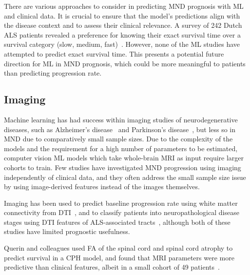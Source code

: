 There are various approaches to consider in predicting MND prognosis with ML and clinical data.
It is crucial to ensure that the model's predictions align with the disease context and to assess their clinical relevance.
A survey of 242 Dutch ALS patients revealed a preference for knowing their exact survival time over a survival category (slow, medium, fast)~\cite{westenengPrognosisPatientsAmyotrophic2018}.
However, none of the ML studies have attempted to predict exact survival time.
This presents a potential future direction for ML in MND prognosis, which could be more meaningful to patients than predicting progression rate.

\subsection{Imaging}

Machine learning has had success within imaging studies of neurodegenerative diseases, such as Alzheimer's disease~\cite{petersenAlzheimerDiseaseNeuroimaging2010} and Parkinson's disease~\cite{marekParkinsonProgressionMarkers2018}, but less so in MND due to comparatively small sample sizes.
Due to the complexity of the models and the requirement for a high number of parameters to be estimated, computer vision ML models which take whole-brain MRI as input require larger cohorts to train.
Few studies have investigated MND progression using imaging independently of clinical data, and they often address the small sample size issue by using image-derived features instead of the images themselves.

Imaging has been used to predict baseline progression rate using white matter connectivity from DTI~\cite{liDisruptionWhiteMatter2021}, and to classify patients into neuropathological disease stages using DTI features of ALS-associated tracts~\cite{behlerMultivariateBayesianClassification2022}, although both of these studies have limited prognostic usefulness.

Querin and colleagues used FA of the spinal cord and spinal cord atrophy to predict survival in a CPH model, and found that MRI parameters were more predictive than clinical features, albeit in a small cohort of 49 patients~\cite{querinSpinalCordMultiparametric2017}.

